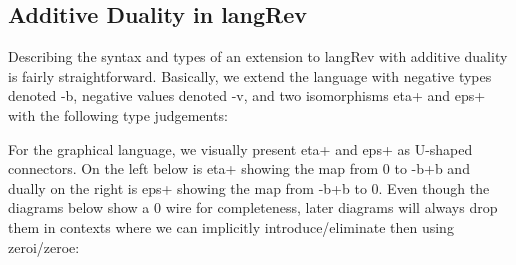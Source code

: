 \documentclass[preprint]{sigplanconf}
\begin{document}
\subsection{Additive Duality in {{langRev}} }

Describing the syntax and types of an extension to {{langRev}} with additive
duality is fairly straightforward. Basically, we extend the language with
negative types denoted {{-b}}, negative values denoted {{-v}}, and two
isomorphisms {{eta+}} and {{eps+}} with the following type judgements:

%

\vspace{-15pt}
\begin{multicols}{2}  

\end{multicols}



For the graphical language, we visually present {{eta+}} and {{eps+}} as
U-shaped connectors. On the left below is {{eta+}} showing the map from {{0}}
to {{-b+b}} and dually on the right is {{eps+}} showing the map from {{-b+b}}
to 0. Even though the diagrams below show a {{0}} wire for completeness,
later diagrams will always drop them in contexts where we can implicitly
introduce/eliminate then using {{zeroi}}/{{zeroe}}:
\begin{multicols}{2}
\begin{center}
\end{center}
  
\begin{center}
\end{center}
\end{multicols}
\end{document}
